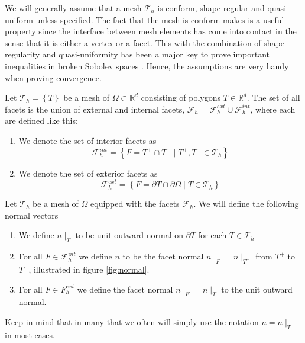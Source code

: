 We will generally assume that a mesh $\mathcal{T}_{h} $ is conform, shape regular and quasi-uniform unless specified. The fact that the mesh is conform makes is a useful property since the interface between mesh elements has come into contact in the sense
that it is either a vertex or a facet. This with the combination of shape regularity and quasi-uniformity has been a major key to prove important inequalities in broken Sobolev spaces \cite[Chapter 1.4.1]{pietro2012}. Hence, the assumptions are
very handy when proving convergence.

\begin{definition}[Facets]
Let $\mathcal{T}_{h}  = \left\{ T \right\} $ be a mesh of $\Omega \subset  \mathbb{R} ^d $ consisting of polygons $T \in \mathbb{R} ^{d}$.
The set of all facets is the union of external and internal facets, $\mathcal{F} _{h} = \mathcal{F} ^{ext}_{h} \cup \mathcal{F} _{h}^{int} $, where each are defined like this:
\begin{enumerate}[label=\arabic*)]
    \item We denote the set of interior facets as \[
            \mathcal{F}^{int} _{h} = \left\{ F=T^{+}\cap T^{-}  \mid  T^{+}, T^{-} \in \mathcal{T}_{h}  \right\}
\]
\item We denote the set of exterior facets as
\[
            \mathcal{F}^{ext} _{h} = \left\{ F= \partial T \cap \partial \Omega    \mid  T  \in \mathcal{T}_{h}  \right\}
\]
\end{enumerate}
\end{definition}


\begin{definition}
Let $\mathcal{T}_{h} $ be a mesh of $\Omega $ equipped with the facets $\mathcal{F}_{h} $. We will define the following normal vectors
\begin{enumerate}[label=\arabic*)]
    \item We define $n \mid _{T}$ to be unit outward normal on $\partial T$ for each $T \in \mathcal{T}_{h} $
 \item For all $F \in \mathcal{F }^{int} _{h}$ we define $n$ to be the facet normal $ n  \mid_F = n \mid _{T^{+}} $  from $T^{+}$ to $T^{-}$, illustrated in figure \ref{fig:normal}.
 \item For all $F \in F^{ext}_{h}$ we define the facet normal $n \mid _{F} = n \mid _{T} $ to the unit outward normal.
\end{enumerate}
Keep in mind that in many that we often will simply use the notation $n = n \mid _{T}$ in most cases.
\end{definition}

